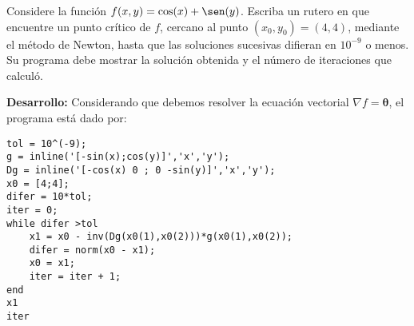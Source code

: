 Considere la funci\'on $f(x,y)=\cos(x)+\sen(y)$. Escriba un rutero en \matlab que encuentre un punto cr\'itico de $f$, cercano al punto $(x_0,y_0)=(4,4)$, mediante el m\'etodo de Newton, hasta que las soluciones sucesivas difieran en $10^{-9}$ o menos. Su programa debe mostrar la soluci\'on obtenida y el n\'umero de iteraciones que calcul\'o.

\textbf{Desarrollo:} Considerando que debemos resolver la ecuaci\'on vectorial $\nabla f = \boldsymbol{\theta}$,  el programa est\'a dado por:

\begin{lstlisting}
tol = 10^(-9);
g = inline('[-sin(x);cos(y)]','x','y');
Dg = inline('[-cos(x) 0 ; 0 -sin(y)]','x','y');
x0 = [4;4];
difer = 10*tol;
iter = 0;
while difer >tol
    x1 = x0 - inv(Dg(x0(1),x0(2)))*g(x0(1),x0(2));
    difer = norm(x0 - x1);
    x0 = x1;
    iter = iter + 1;
end
x1
iter
\end{lstlisting}

